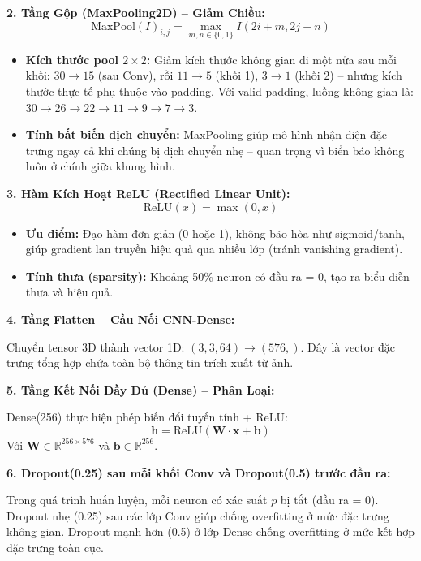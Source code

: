 \documentclass[12pt,a4paper]{article}
\begin{document}
\textbf{2. Tầng Gộp (MaxPooling2D) -- Giảm Chiều:}
\begin{equation}
    \text{MaxPool}(I)_{i,j} = \max_{m,n \in \{0,1\}} I(2i+m, 2j+n)
\end{equation}
\begin{itemize}
    \item \textbf{Kích thước pool $2\times2$:} Giảm kích thước không gian đi một nửa sau mỗi khối: $30\to15$ (sau Conv), rồi $11\to5$ (khối 1), $3\to1$ (khối 2) -- nhưng kích thước thực tế phụ thuộc vào padding. Với valid padding, luồng không gian là: $30\to26\to22\to11\to9\to7\to3$.
    \item \textbf{Tính bất biến dịch chuyển:} MaxPooling giúp mô hình nhận diện đặc trưng ngay cả khi chúng bị dịch chuyển nhẹ -- quan trọng vì biển báo không luôn ở chính giữa khung hình.
\end{itemize}

\textbf{3. Hàm Kích Hoạt ReLU (Rectified Linear Unit):}
\begin{equation}
    \text{ReLU}(x) = \max(0, x)
\end{equation}
\begin{itemize}
    \item \textbf{Ưu điểm:} Đạo hàm đơn giản (0 hoặc 1), không bão hòa như sigmoid/tanh, giúp gradient lan truyền hiệu quả qua nhiều lớp (tránh vanishing gradient).
    \item \textbf{Tính thưa (sparsity):} Khoảng 50\% neuron có đầu ra = 0, tạo ra biểu diễn thưa và hiệu quả.
\end{itemize}

\textbf{4. Tầng Flatten -- Cầu Nối CNN-Dense:}

Chuyển tensor 3D thành vector 1D: $(3, 3, 64) \to (576,)$. Đây là vector đặc trưng tổng hợp chứa toàn bộ thông tin trích xuất từ ảnh.

\textbf{5. Tầng Kết Nối Đầy Đủ (Dense) -- Phân Loại:}

Dense(256) thực hiện phép biến đổi tuyến tính + ReLU:
\begin{equation}
    \mathbf{h} = \text{ReLU}(\mathbf{W} \cdot \mathbf{x} + \mathbf{b})
\end{equation}
Với $\mathbf{W} \in \mathbb{R}^{256 \times 576}$ và $\mathbf{b} \in \mathbb{R}^{256}$.

\textbf{6. Dropout(0.25) sau mỗi khối Conv và Dropout(0.5) trước đầu ra:}

Trong quá trình huấn luyện, mỗi neuron có xác suất $p$ bị tắt (đầu ra = 0). Dropout nhẹ (0.25) sau các lớp Conv giúp chống overfitting ở mức đặc trưng không gian. Dropout mạnh hơn (0.5) ở lớp Dense chống overfitting ở mức kết hợp đặc trưng toàn cục.
\end{document}
